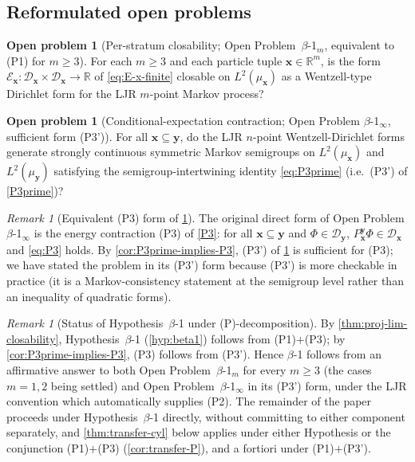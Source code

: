 \documentclass[11pt,reqno]{amsart}
\theoremstyle{plain}
\theoremstyle{definition}
\newtheorem{problem}[theorem]{Open problem}
\theoremstyle{remark}
\newtheorem{remark}[theorem]{Remark}
\newcommand{\R}{\mathbb R}
\newcommand{\cE}{\mathcal E}
\begin{document}
\subsection{Reformulated open problems}\label{sec:formclos-open}

\begin{problem}[Per-stratum closability;
Open Problem~$\beta$-1${}_{m}$, equivalent to (P1) for
$m\ge 3$]\label{prob:per-stratum}
For each $m\ge 3$ and each particle tuple $\mathbf x\in\R^{m}$, is
the form
$\cE_{\mathbf x}\colon\mathcal D_{\mathbf x}\times\mathcal D_{\mathbf x}\to\R$
of \cref{eq:E-x-finite} closable on $L^{2}(\mu_{\mathbf x})$ as a
Wentzell-type Dirichlet form for the LJR $m$-point Markov process?
\end{problem}

\begin{problem}[Conditional-expectation contraction; Open Problem
$\beta$-1${}_{\infty}$, sufficient form (P3')]\label{prob:proj-lim}
For all $\mathbf x\subseteq\mathbf y$, do the LJR $n$-point
Wentzell-Dirichlet forms generate strongly continuous symmetric
Markov semigroups on $L^{2}(\mu_{\mathbf x})$ and
$L^{2}(\mu_{\mathbf y})$ satisfying the semigroup-intertwining
identity \cref{eq:P3prime} (i.e.\ (P3') of \cref{P3prime})?
\end{problem}

\begin{remark}[Equivalent (P3) form of \cref{prob:proj-lim}]\label{rem:P3-form-of-proj-lim}
The original direct form of Open Problem $\beta$-1${}_{\infty}$ is
the energy contraction (P3) of \cref{P3}: for all
$\mathbf x\subseteq\mathbf y$ and $\Phi\in\mathcal D_{\mathbf y}$,
$P_{\mathbf x}^{\mathbf y}\Phi\in\mathcal D_{\mathbf x}$ and
\cref{eq:P3} holds. By \cref{cor:P3prime-implies-P3}, (P3') of
\cref{prob:proj-lim} is sufficient for (P3); we have stated the
problem in its (P3') form because (P3') is more checkable in
practice (it is a Markov-consistency statement at the semigroup
level rather than an inequality of quadratic forms).
\end{remark}

\begin{remark}[Status of Hypothesis~$\beta$-1 under (P)-decomposition]\label{rem:proj-limit}
By \cref{thm:proj-lim-closability}, Hypothesis~$\beta$-1
(\cref{hyp:beta1}) follows from (P1)$+$(P3); by
\cref{cor:P3prime-implies-P3}, (P3) follows from (P3'). Hence
$\beta$-1 follows from an affirmative answer to both
Open Problem~$\beta$-1${}_{m}$ for every $m\ge 3$ (the cases
$m=1,2$ being settled) and Open Problem~$\beta$-1${}_{\infty}$
in its (P3') form, under the LJR convention which automatically
supplies (P2). The remainder of the paper proceeds under
Hypothesis~$\beta$-1 directly, without committing to either
component separately, and \cref{thm:transfer-cyl} below applies
under either Hypothesis or the conjunction (P1)$+$(P3)
(\cref{cor:transfer-P}), and a fortiori under (P1)$+$(P3').
\end{remark}
\end{document}

